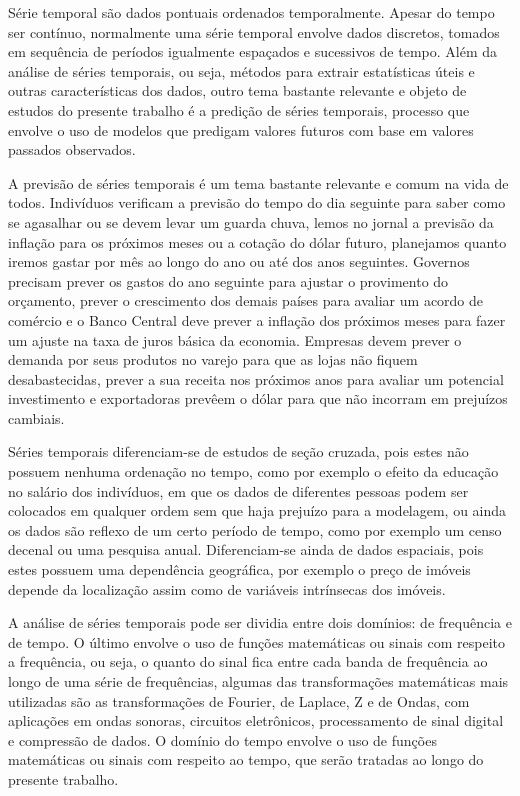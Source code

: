 \documentclass[twocolumn]{rbef}
\newcommand{\1}{\mathbbm{1}}
\begin{document}
Série temporal são dados pontuais ordenados temporalmente. Apesar do tempo ser contínuo, normalmente uma série temporal envolve dados discretos, tomados em sequência de períodos igualmente espaçados e sucessivos de tempo. Além da análise de séries temporais, ou seja, métodos para extrair estatísticas úteis e outras características dos dados, outro tema bastante relevante e objeto de estudos do presente trabalho é a predição de séries temporais, processo que envolve o uso de modelos que predigam valores futuros com base em valores passados observados.

A previsão de séries temporais é um tema bastante relevante e comum na vida de todos. Indivíduos verificam a previsão do tempo do dia seguinte para saber como se agasalhar ou se devem levar um guarda chuva, lemos no jornal a previsão da inflação para os próximos meses ou a cotação do dólar futuro, planejamos quanto iremos gastar por mês ao longo do ano ou até dos anos seguintes. Governos precisam prever os gastos do ano seguinte para ajustar o provimento do orçamento, prever o crescimento dos demais países para avaliar um acordo de comércio e o Banco Central deve prever a inflação dos próximos meses para fazer um ajuste na taxa de juros básica da economia. Empresas devem prever o demanda por seus produtos no varejo para que as lojas não fiquem desabastecidas, prever a sua receita nos próximos anos para avaliar um potencial investimento e exportadoras prevêem o dólar para que não incorram em prejuízos cambiais.

Séries temporais diferenciam-se de estudos de seção cruzada, pois estes não possuem nenhuma ordenação no tempo, como por exemplo o efeito da educação no salário dos indivíduos, em que os dados de diferentes pessoas podem ser colocados em qualquer ordem sem que haja prejuízo para a modelagem, ou ainda os dados são reflexo de um certo período de tempo, como por exemplo um censo decenal ou uma pesquisa anual. Diferenciam-se ainda de dados espaciais, pois estes possuem uma dependência geográfica, por exemplo o preço de imóveis depende da localização assim como de variáveis intrínsecas dos imóveis.

A análise de séries temporais pode ser dividia entre dois domínios: de frequência e de tempo. O último envolve o uso de funções matemáticas  ou sinais com respeito a frequência, ou seja, o quanto do sinal fica entre cada banda de frequência ao longo de uma série de frequências, algumas das transformações matemáticas mais utilizadas são as transformações de Fourier, de Laplace, Z e de Ondas, com aplicações em ondas sonoras, circuitos eletrônicos, processamento de sinal digital e compressão de dados. O domínio do tempo envolve o uso de funções matemáticas ou sinais com respeito ao tempo, que serão tratadas ao longo do presente trabalho.
\end{document}
